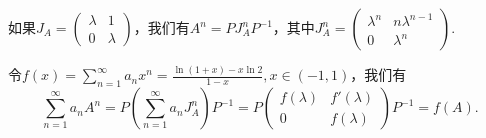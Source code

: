 \begin{solution}
  如果$J_A=\begin{pmatrix}
    \lambda & 1 \\
    0 & \lambda
  \end{pmatrix}$，我们有$A^n=PJ_A^nP^{-1}$，其中$J_A^n=\begin{pmatrix}
    \lambda^n & n\lambda^{n-1} \\
    0 & \lambda^n
  \end{pmatrix}$.

  令$f(x)=\sum_{n=1}^\infty a_nx^n=\frac{\ln(1+x)-x\ln2}{1-x},x\in(-1,1)$，我们有
  \[
    \sum_{n=1}^\infty a_nA^n = P \left( \sum_{n=1}^\infty a_nJ_A^n\right)P^{-1} = P
    \begin{pmatrix}
      f(\lambda) & f'(\lambda) \\
      0 & f(\lambda)
    \end{pmatrix}P^{-1} = f(A).
  \]
\end{solution}

